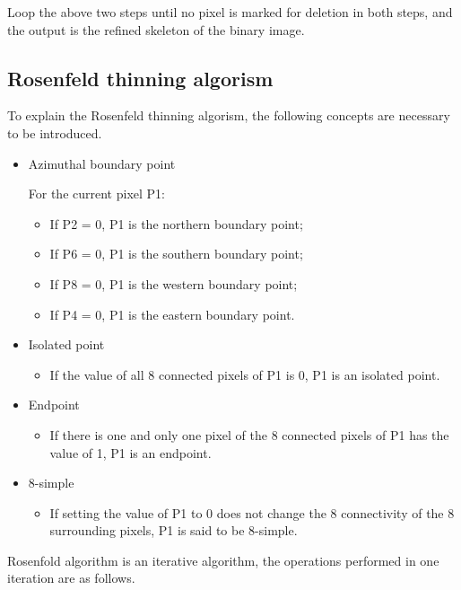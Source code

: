 \documentclass[hyperref]{article}
\theoremstyle{nonumberplain}
\begin{document}
	Loop the above two steps until no pixel is marked for deletion in both steps, and the output is the refined skeleton of the binary image.
	
	\subsection{Rosenfeld thinning algorism}
	
	\hspace{1.0em}
	To explain the Rosenfeld thinning algorism, the following concepts are necessary to be introduced.
	
	\begin{itemize}
		\item Azimuthal boundary point
		
		 For the current pixel P1:
		 \begin{itemize}
			\item If P2 = 0, P1 is the northern boundary point;
			\item If P6 = 0, P1 is the southern boundary point;
			\item If P8 = 0, P1 is the western boundary point;
			\item If P4 = 0, P1 is the eastern boundary point. 
		\end{itemize}
	
		\item Isolated point
		\begin{itemize}
			\item If the value of all 8 connected pixels of P1 is 0, P1 is an isolated point.
		\end{itemize}
	
		\item Endpoint
		\begin{itemize}
			\item If there is one and only one pixel of the 8 connected pixels of P1 has the value of 1, P1 is an endpoint.
		\end{itemize}
		
		\item 8-simple
		\begin{itemize}
			\item If setting the value of P1 to 0 does not change the 8 connectivity of the 8 surrounding pixels, P1 is said to be 8-simple.
		\end{itemize}
		
	\end{itemize}

	Rosenfold algorithm is an iterative algorithm, the operations performed in one iteration are as follows.
	
\end{document}

